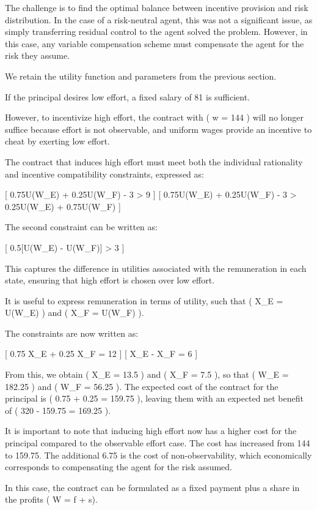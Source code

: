 \documentclass[
  letterpaper,
  DIV=11,
  numbers=noendperiod]{scrartcl}
\begin{document}
The challenge is to find the optimal balance between incentive provision
and risk distribution. In the case of a risk-neutral agent, this was not
a significant issue, as simply transferring residual control to the
agent solved the problem. However, in this case, any variable
compensation scheme must compensate the agent for the risk they assume.

We retain the utility function and parameters from the previous section.

If the principal desires low effort, a fixed salary of 81 is sufficient.

However, to incentivize high effort, the contract with ( w = 144 ) will
no longer suffice because effort is not observable, and uniform wages
provide an incentive to cheat by exerting low effort.

The contract that induces high effort must meet both the individual
rationality and incentive compatibility constraints, expressed as:

{[} 0.75U(W\_E) + 0.25U(W\_F) - 3 \textgreater{} 9 {]} {[} 0.75U(W\_E) +
0.25U(W\_F) - 3 \textgreater{} 0.25U(W\_E) + 0.75U(W\_F) {]}

The second constraint can be written as:

{[} 0.5{[}U(W\_E) - U(W\_F){]} \textgreater{} 3 {]}

This captures the difference in utilities associated with the
remuneration in each state, ensuring that high effort is chosen over low
effort.

It is useful to express remuneration in terms of utility, such that (
X\_E = U(W\_E) ) and ( X\_F = U(W\_F) ).

The constraints are now written as:

{[} 0.75 \times X\_E + 0.25 \times X\_F = 12 {]} {[} X\_E - X\_F = 6 {]}

From this, we obtain ( X\_E = 13.5 ) and ( X\_F = 7.5 ), so that ( W\_E
= 182.25 ) and ( W\_F = 56.25 ). The expected cost of the contract for
the principal is ( 0.75  + 0.25  = 159.75 ),
leaving them with an expected net benefit of ( 320 - 159.75 = 169.25 ).

It is important to note that inducing high effort now has a higher cost
for the principal compared to the observable effort case. The cost has
increased from 144 to 159.75. The additional 6.75 is the cost of
non-observability, which economically corresponds to compensating the
agent for the risk assumed.

In this case, the contract can be formulated as a fixed payment plus a
share in the profits ( W = f + s\pi ).
\end{document}
